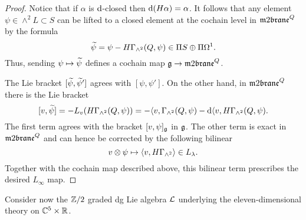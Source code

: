 \documentclass[11pt]{amsart}
\begin{document}
\begin{proof}
Notice that if $\alpha$ is $\d$-closed then $\d (H \alpha) = \alpha$. 
It follows that any element $\psi \in \wedge^2 L \subset S$ can be lifted to a closed element at the cochain level in $\m2^Q$ by the formula
\[
\Tilde{\psi} = \psi - H \Gamma_{\wedge^2} (Q, \psi) \in \Pi S \oplus \Pi \Omega^1 .
\]
Thus, sending $\psi \mapsto \Tilde{\psi}$ defines a cochain map $\fg \to \m2^Q$. 

The Lie bracket $[\Tilde{\psi}, \Tilde{\psi}']$ agrees with $[\psi, \psi']$. 
On the other hand, in $\m2^Q$ there is the Lie bracket 
\[
[v,\Tilde{\psi}] = - L_v (H \Gamma_{\wedge^2} (Q, \psi)) = -\<v, \Gamma_{\wedge^2}(Q, \psi) - \d \<v, H \Gamma_{\wedge^2}(Q, \psi) .
\]
The first term agrees with the bracket $[v, \psi]_{\fg}$ in $\fg$. 
The other term is exact in $\m2^Q$ and can hence be corrected by the following bilinear  
\[
v \otimes \psi \mapsto \<v, H \Gamma_{\wedge^2} \> \in L_\lambda .
\] 
Together with the cochain map described above, this bilinear term prescribes the desired $L_\infty$ map. 

\end{proof}

\parsec[s:residual]
Consider now the $\ZZ/2$ graded dg Lie algebra $\cL$ underlying the eleven-dimensional theory on $\CC^5 \times \RR$. 
\end{document}
